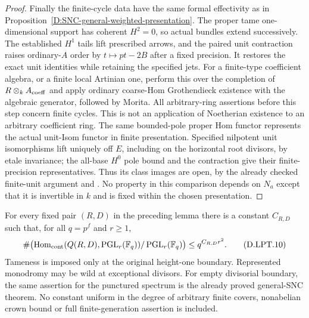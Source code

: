 \begin{proof}
Finally the finite-cycle data have the same formal effectivity
as in Proposition~\ref{D:SNC-general-weighted-presentation}.
The proper tame one-dimensional support has coherent $H^2=0$,
so actual bundles extend successively. The established $H^1$
tails lift prescribed arrows, and the paired unit contraction
raises ordinary-$A$ order by $t\mapsto pt-2B$ after a fixed
precision. It restores the exact unit identities while retaining
the specified jets. For a finite-type coefficient algebra, or a
finite local Artinian one, perform this over the completion of
$R\otimes_k A_{\rm coeff}$ and apply ordinary coarse-Hom
Grothendieck existence with the algebraic generator, followed by
Morita. All arbitrary-ring assertions before this step concern
finite cycles. This is not an application of Noetherian existence
to an arbitrary coefficient ring.
The same bounded-pole proper Hom functor represents the actual
unit-Isom functor in finite presentation. Specified nilpotent
unit isomorphisms lift uniquely off $E$, including on the horizontal
root divisors, by etale invariance; the all-base $H^0$ pole bound
and the contraction give their finite-precision representatives.
Thus its class images are open, by the already checked
finite-unit argument and
\citep[Tags~08K6, 0BQB, 02HT, 02HM and~00UR]{StacksUnitJetTransferD}.
No property in this comparison depends on $N_a$ except that it is
invertible in $k$ and is fixed within the chosen presentation.
\end{proof}

\begin{theorem}
\label{D:local-divisorial-tame-projective-growth}
For every fixed pair $(R,D)$ in the preceding lemma there is a
constant $C_{R,D}$ such that, for all $q=p^f$ and $r\geq1$,
\[
 \#\bigl(\operatorname{Hom}_{\rm cont}
          (Q(R,D),\operatorname{PGL}_r(\mathbb F_q))
                    /\operatorname{PGL}_r(\mathbb F_q)\bigr)
                         \le q^{C_{R,D}r^2}.
 \tag{D.LPT.10}
\]
Tameness is imposed only at the original height-one boundary.
Represented monodromy may be wild at exceptional divisors.
For empty divisorial boundary, the same assertion for the
punctured spectrum is the already proved general-SNC theorem.
No constant uniform in the degree of arbitrary finite covers,
nonabelian crown bound or full finite-generation assertion is
included.
\end{theorem}

